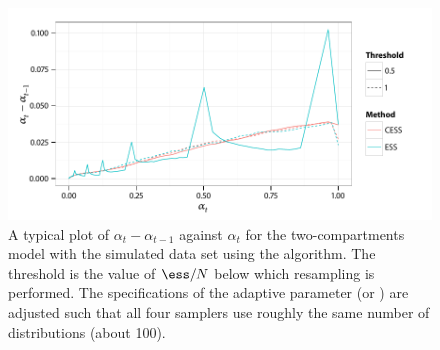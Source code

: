 \begin{figure}[t]
  \UseAltLinespread
  \includegraphics[width=\linewidth]{fig_src/Adaptive_Dist}
  \caption[Variations of the distribution specification parameter for the
  \protect\pet compartmental model using adaptive \protect\smc algorithms]
  {A typical plot of $\alpha_t - \alpha_{t-1}$ against $\alpha_t$ for the two-compartments \pet model with the simulated data set using the \smc[2] algorithm. The threshold is the value of $\ess/N$ below which resampling is performed. The specifications of the adaptive parameter (\ess or \cess) are adjusted such that all four samplers use roughly the same number of distributions (about 100).}
  \label{fig:adaptive_alpha}
\end{figure}
